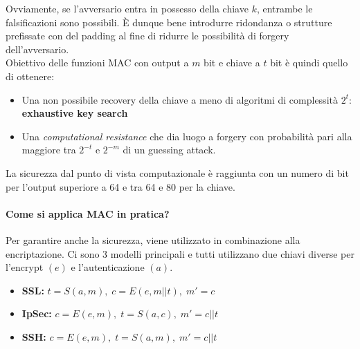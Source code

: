\documentclass[a4paper,12pt]{article}
\begin{document}
Ovviamente, se l'avversario entra in possesso della chiave $k$, entrambe le falsificazioni sono possibili. È dunque bene introdurre ridondanza o strutture prefissate con del padding al fine di ridurre le possibilità di forgery dell'avversario. \\
Obiettivo delle funzioni MAC con output a $m$ bit e chiave a $t$ bit è quindi quello di ottenere:
\begin{itemize}
	\item Una non possibile recovery della chiave a meno di algoritmi di complessità $2^t$: \textbf{exhaustive key search}
	\item Una \textit{computational resistance} che dia luogo a forgery con probabilità pari alla maggiore tra $2^{-t}$ e $2^{-m}$ di un guessing attack.
\end{itemize}
La sicurezza dal punto di vista computazionale è raggiunta con un numero di bit per l'output superiore a 64 e tra 64 e 80 per la chiave.

\paragraph{Come si applica MAC in pratica?} Per garantire anche la sicurezza, viene utilizzato in combinazione alla encriptazione. Ci sono 3 modelli principali e tutti utilizzano due chiavi diverse per l'encrypt $(e)$ e l'autenticazione $(a)$. \\
\begin{itemize}
	\item \textbf{SSL:} $t = S(a,m),\; c = E(e,m||t),\; m' = c$
	\item \textbf{IpSec:} $c = E(e, m),\; t = S(a,c),\; m' = c || t$
	\item \textbf{SSH:} $c = E(e, m),\; t = S(a, m),\; m' = c || t$
\end{itemize}
\end{document}
